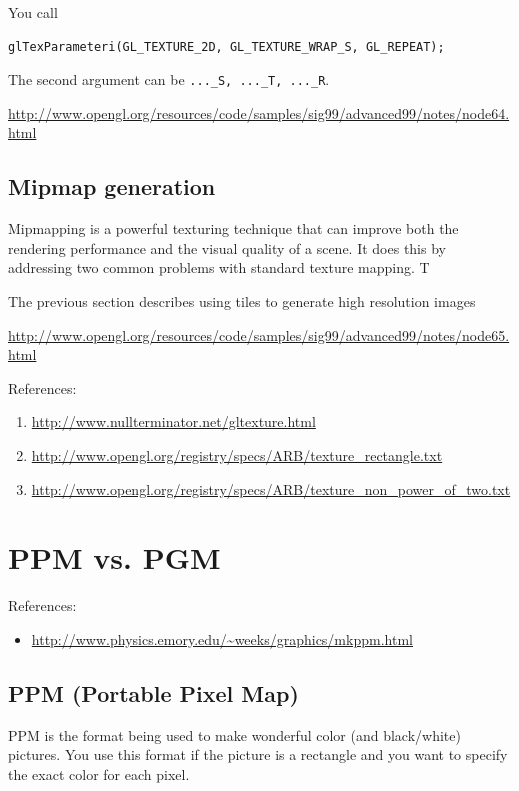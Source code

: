 You call
\begin{verbatim}
glTexParameteri(GL_TEXTURE_2D, GL_TEXTURE_WRAP_S, GL_REPEAT);
\end{verbatim}
The second argument can be \verb!..._S, ..._T, ..._R!. 

\url{http://www.opengl.org/resources/code/samples/sig99/advanced99/notes/node64.html}

\subsection{Mipmap generation}
\label{sec:mipmap-generation}

Mipmapping is a powerful texturing technique that can improve both the
rendering performance and the visual quality of a scene. It does this
by addressing two common problems with standard texture mapping. T

The previous section describes using tiles to generate high resolution
images 

\url{http://www.opengl.org/resources/code/samples/sig99/advanced99/notes/node65.html}


References:
\begin{enumerate}
\item \url{http://www.nullterminator.net/gltexture.html}
\item
  \url{http://www.opengl.org/registry/specs/ARB/texture_rectangle.txt} 
\item
  \url{http://www.opengl.org/registry/specs/ARB/texture_non_power_of_two.txt} 
\end{enumerate}


\section{PPM vs. PGM}
\label{sec:ppm-vs.-pgm}

References:
\begin{itemize}
\item \url{http://www.physics.emory.edu/~weeks/graphics/mkppm.html}
\end{itemize}
\subsection{PPM (Portable Pixel Map)}
\label{sec:ppm-portable-pixel}

PPM is the format being used to make wonderful color (and black/white)
pictures. You use this format if the picture is a rectangle and you
want to specify the exact color for each pixel. 

